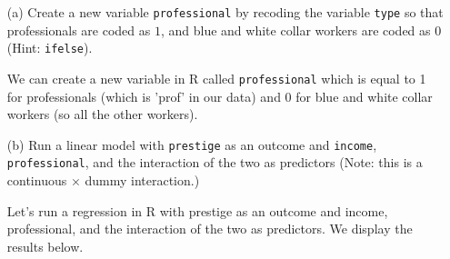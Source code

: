 \documentclass[12pt,letterpaper]{article}
\begin{document}
\newpage
\begin{enumerate}
	
	\item [(a)]
	Create a new variable \texttt{professional} by recoding the variable \texttt{type} so that professionals are coded as $1$, and blue and white collar workers are coded as $0$ (Hint: \texttt{ifelse}).
	
	We can create a new variable in R called \texttt{professional} which is equal to 1 for professionals (which is 'prof' in our data) and 0 for blue and white collar workers (so all the other workers).
	
	
	\vspace{1cm}
	
	
	\item [(b)]
	Run a linear model with \texttt{prestige} as an outcome and \texttt{income}, \texttt{professional}, and the interaction of the two as predictors (Note: this is a continuous $\times$ dummy interaction.)
	
	Let's run a regression in R with prestige as an outcome and income, professional, and the interaction of the two as predictors. We display the results below.
	
	

\end{enumerate}
\end{document}
